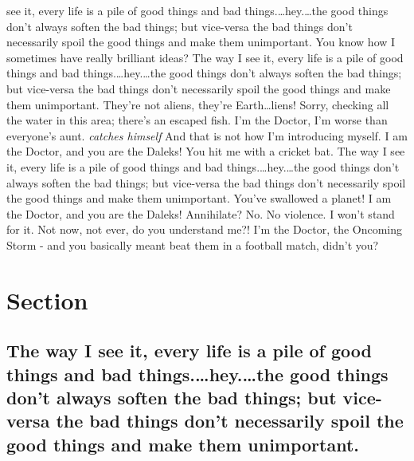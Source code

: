 \documentclass[]{report}
\begin{document}
see it, every life is a pile of good things and bad
things.\ldots{}hey.\ldots{}the good things don't always soften the bad
things; but vice-versa the bad things don't necessarily spoil the good
things and make them unimportant. You know how I sometimes have really
brilliant ideas? The way I see it, every life is a pile of good things
and bad things.\ldots{}hey.\ldots{}the good things don't always soften
the bad things; but vice-versa the bad things don't necessarily spoil
the good things and make them unimportant. They're not aliens, they're
Earth\ldots{}liens! Sorry, checking all the water in this area; there's
an escaped fish. I'm the Doctor, I'm worse than everyone's aunt.
\emph{catches himself} And that is not how I'm introducing myself. I am
the Doctor, and you are the Daleks! You hit me with a cricket bat. The
way I see it, every life is a pile of good things and bad
things.\ldots{}hey.\ldots{}the good things don't always soften the bad
things; but vice-versa the bad things don't necessarily spoil the good
things and make them unimportant. You've swallowed a planet! I am the
Doctor, and you are the Daleks! Annihilate? No. No violence. I won't
stand for it. Not now, not ever, do you understand me?! I'm the Doctor,
the Oncoming Storm - and you basically meant beat them in a football
match, didn't you?

\section{Section}\label{section-3.2}

\subsection{The way I see it, every life is a pile of good things and
bad things.\ldots{}hey.\ldots{}the good things don't always soften the
bad things; but vice-versa the bad things don't necessarily spoil the
good things and make them
unimportant.}\label{the-way-i-see-it-every-life-is-a-pile-of-good-things-and-bad-things.hey.the-good-things-dont-always-soften-the-bad-things-but-vice-versa-the-bad-things-dont-necessarily-spoil-the-good-things-and-make-them-unimportant.}
\end{document}
